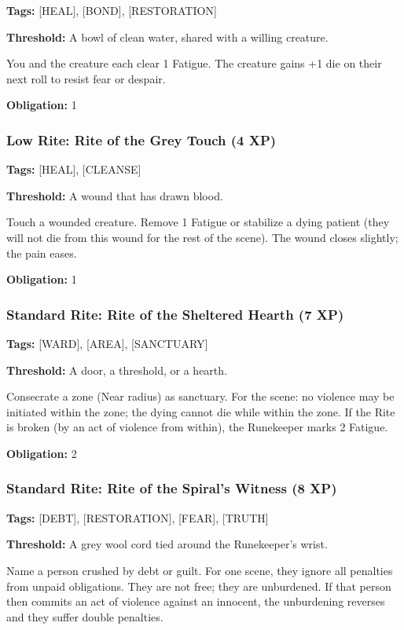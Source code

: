 \textbf{Tags:} [HEAL], [BOND], [RESTORATION]

\textbf{Threshold:} A bowl of clean water, shared with a willing creature.

You and the creature each clear 1 Fatigue. The creature gains +1 die on their next roll to resist fear or despair.

\textbf{Obligation:} 1

\subsubsection{Low Rite: Rite of the Grey Touch (4 XP)}

\textbf{Tags:} [HEAL], [CLEANSE]

\textbf{Threshold:} A wound that has drawn blood.

Touch a wounded creature. Remove 1 Fatigue or stabilize a dying patient (they will not die from this wound for the rest of the scene). The wound closes slightly; the pain eases.

\textbf{Obligation:} 1

\subsubsection{Standard Rite: Rite of the Sheltered Hearth (7 XP)}

\textbf{Tags:} [WARD], [AREA], [SANCTUARY]

\textbf{Threshold:} A door, a threshold, or a hearth.

Consecrate a zone (Near radius) as sanctuary. For the scene: no violence may be initiated within the zone; the dying cannot die while within the zone. If the Rite is broken (by an act of violence from within), the Runekeeper marks 2 Fatigue.

\textbf{Obligation:} 2

\subsubsection{Standard Rite: Rite of the Spiral's Witness (8 XP)}

\textbf{Tags:} [DEBT], [RESTORATION], [FEAR], [TRUTH]

\textbf{Threshold:} A grey wool cord tied around the Runekeeper's wrist.

Name a person crushed by debt or guilt. For one scene, they ignore all penalties from unpaid obligations. They are not free; they are unburdened. If that person then commits an act of violence against an innocent, the unburdening reverses and they suffer double penalties.

